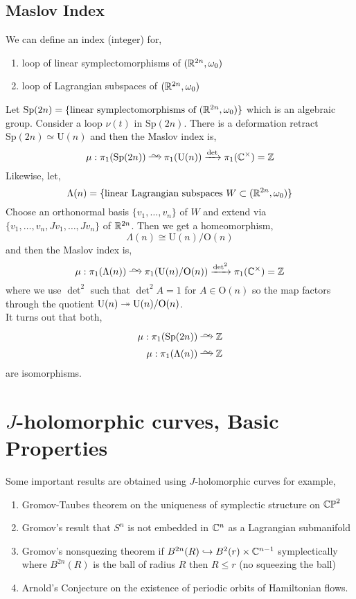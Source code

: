 \documentclass[12pt]{article}
\begin{document}
\subsection{Maslov Index}

\newcommand{\Sp}{\mathrm{Sp}}
\renewcommand{\U}{\mathrm{U}}
\renewcommand{\O}{\mathrm{O}}

We can define an index (integer) for,
\begin{enumerate}
\item loop of linear symplectomorphisms of $(\mathbb{R}^{2n}, \omega_0)$ 
\item loop of Lagrangian subspaces of $(\mathbb{R}^{2n}, \omega_0)$
\end{enumerate}

Let $\Sp(2n) = \{ \text{linear symplectomorphisms of } (\R^{2n}, \omega_0) \}$ which is an algebraic group. Consider a loop $\nu(t)$ in $\Sp(2n)$. There is a deformation retract $\Sp(2n) \simeq \U(n)$ and then the Maslov index is,
\[ \mu : \pi_1(\Sp(2n)) \iso \pi_1(\U(n)) \xrightarrow{\det} \pi_1(\C^\times) = \Z \]
Likewise, let,
\[ \Lambda(n) = \{ \text{linear Lagrangian subspaces } W \subset (\mathbb{R}^{2n}, \omega_0) \} \]
Choose an orthonormal basis $\{ v_1, \dots, v_n \}$ of $W$ and extend via $\{ v_1, \dots, v_n, J v_1, \dots, J v_n \}$ of $\mathbb{R}^{2n}$. Then we get a homeomorphism,
\[ \Lambda(n) \cong \U(n) / \O(n) \]
and then the Maslov index is,
\[ \mu : \pi_1(\Lambda(n)) \iso \pi_1(\U(n)/\O(n)) \xrightarrow{\det^2} \pi_1(\C^\times) = \Z \]
where we use $\det^2$ such that $\det^2{A} = 1$ for $A \in \O(n)$ so the map factors through the quotient $\U(n) \onto \U(n) / \O(n)$. 
\bigskip\\
It turns out that both,
\begin{align*}
\mu : \pi_1(\Sp(2n)) & \iso \Z
\\
\mu :  \pi_1(\Lambda(n)) & \iso \Z 
\end{align*}
are isomorphisms.

\section{$J$-holomorphic curves, Basic Properties}

\begin{rmk}
Some important results are obtained using $J$-holomorphic curves for example,
\begin{enumerate}
\item Gromov-Taubes theorem on the uniqueness of symplectic structure on $\mathbb{CP}^2$
\item Gromov's result that $S^n$ is not embedded in $\mathbb{C}^n$ as a Lagrangian submanifold
\item Gromov's nonsquezing theorem if $B^{2n}(R) \hookrightarrow B^2(r) \times \mathbb{C}^{n-1}$ symplectically where $B^{2n}(R)$ is the ball of radius $R$ then $R \le r$ (no squeezing the ball)
\item Arnold's Conjecture on the existence of periodic orbits of Hamiltonian flows. 
\end{enumerate}
\end{rmk}
\end{document}
